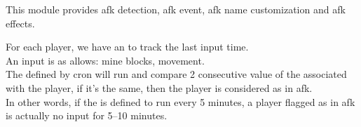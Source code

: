 
This module provides afk detection, afk event, afk name customization and afk effects.

For each player, we have an  to track the last input time.\\
An input is as allows: mine blocks, movement.\\
The  defined by cron will run and compare 2 consecutive value of the  associated with the player, if it's the same, then the player is considered as in afk.\\
In other words, if the  is defined to run every 5 minutes, a player flagged as in afk is actually no input for 5--10 minutes.


